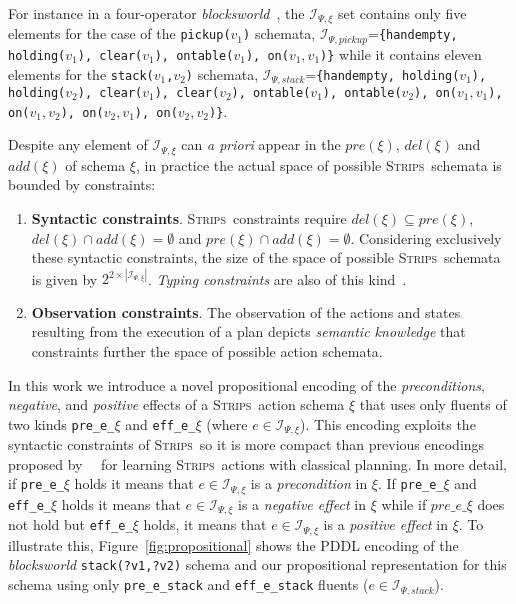 \documentclass[letterpaper]{article} %
\newcommand{\strips}{\textsc{Strips}}     %
\begin{document}
For instance in a four-operator {\em blocksworld}~\cite{slaney2001blocks}, the ${\mathcal I}_{\Psi,\xi}$ set contains only five elements for the case of the {\small \tt pickup($v_1$)} schemata, ${\mathcal I}_{\Psi,pickup}$={\small\tt\{handempty, holding($v_1$), clear($v_1$), ontable($v_1$), on($v_1,v_1$)\}} while it contains eleven elements for the {\small \tt stack($v_1$,$v_2$)} schemata, ${\mathcal I}_{\Psi,stack}$={\small\tt\{handempty, holding($v_1$), holding($v_2$), clear($v_1$), clear($v_2$), ontable($v_1$), ontable($v_2$), on($v_1,v_1$), on($v_1,v_2$), on($v_2,v_1$), on($v_2,v_2$)\}}. 

Despite any element of ${\mathcal I}_{\Psi,\xi}$ can {\em a priori} appear in the $pre(\xi)$, $del(\xi)$ and $add(\xi)$ of schema $\xi$, in practice the actual space of possible \strips\ schemata is bounded by constraints:
\begin{enumerate}
\item {\bf Syntactic constraints}. \strips\ constraints require $del(\xi)\subseteq pre(\xi)$, $del(\xi)\cap add(\xi)=\emptyset$ and $pre(\xi)\cap add(\xi)=\emptyset$. Considering exclusively these syntactic constraints, the size of the space of possible \strips\ schemata is given by $2^{2\times|{\mathcal I}_{\Psi,\xi}|}$. {\em Typing constraints} are also of this kind~\cite{mcdermott1998pddl}. 
\item {\bf Observation constraints}. The observation of the actions and states resulting from the execution of a plan depicts {\em semantic knowledge} that constraints further the space of possible action schemata.   
\end{enumerate}

In this work we introduce a novel propositional encoding of the {\em preconditions}, {\em negative}, and {\em positive} effects of a \strips\ action schema $\xi$ that uses only fluents of two kinds {\tt\small pre\_e\_$\xi$} and {\tt\small eff\_e\_$\xi$} (where $e\in{\mathcal I}_{\Psi,\xi}$). This encoding exploits the syntactic constraints of \strips\, so it is more compact than previous encodings proposed by~\citeauthor{aineto2018learning}~\citeyear{aineto2018learning} for learning \strips\ actions with classical planning. In more detail, if {\tt\small pre\_e\_$\xi$} holds it means that $e\in{\mathcal I}_{\Psi,\xi}$ is a {\em precondition} in $\xi$. If {\tt\small pre\_e\_$\xi$} and {\tt\small eff\_e\_$\xi$} holds it means that $e\in{\mathcal I}_{\Psi,\xi}$ is a {\em negative effect} in $\xi$ while if $pre\_e\_\xi$ does not hold but {\tt\small eff\_e\_$\xi$} holds, it means that $e\in{\mathcal I}_{\Psi,\xi}$ is a {\em positive effect} in $\xi$. To illustrate this, Figure~\ref{fig:propositional} shows the PDDL encoding of the {\em blocksworld} {\tt\small stack(?v1,?v2)} schema and our propositional representation for this schema using only {\tt\small pre\_e\_stack} and {\tt\small eff\_e\_stack} fluents ($e\in{\mathcal I}_{\Psi,stack}$).
\end{document}
